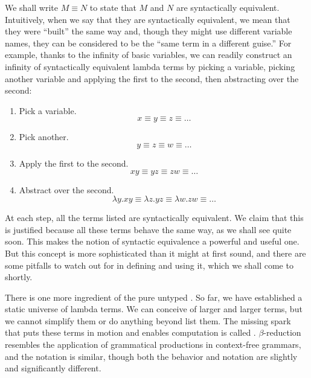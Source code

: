We shall write $M \equiv N$ to state that $M$ and $N$ are syntactically equivalent. Intuitively, when we say that they are syntactically equivalent, we mean that they were ``built'' the same way and, though they might use different variable names, they can be considered to be the ``same term in a different guise.'' For example, thanks to the infinity of basic variables, we can readily construct an infinity of syntactically equivalent lambda terms by picking a variable, picking another variable and applying the first to the second, then abstracting over the second:
\begin{enumerate}
\item Pick a variable.
\[
x \equiv y \equiv z \equiv \dotso
\]
\item Pick another.
\[
y \equiv z  \equiv w \equiv \dots
\]
\item Apply the first to the second.
\[
x y \equiv y z  \equiv z w \equiv \dots
\]
\item Abstract over the second.
\[
\lambda y . x y \equiv \lambda z . y z \equiv \lambda w . z w \equiv \dotso
\]
\end{enumerate}
At each step, all the terms listed are syntactically equivalent. We claim that this is justified because all these terms behave the same way, as we shall see quite soon. This makes the notion of syntactic equivalence a powerful and useful one. But this concept is more sophisticated than it might at first sound, and there are some pitfalls to watch out for in defining and using it, which we shall come to shortly.

There is one more ingredient of the pure untyped \lambdacalc{}. So far, we have established a static universe of lambda terms. We can conceive of larger and larger terms, but we cannot simplify them or do anything beyond list them. The missing spark that puts these terms in motion and enables computation is called . $\beta$-re\-duc\-tion resembles the application of grammatical productions in context-free grammars, and the notation is similar, though both the behavior and notation are slightly and significantly different.

